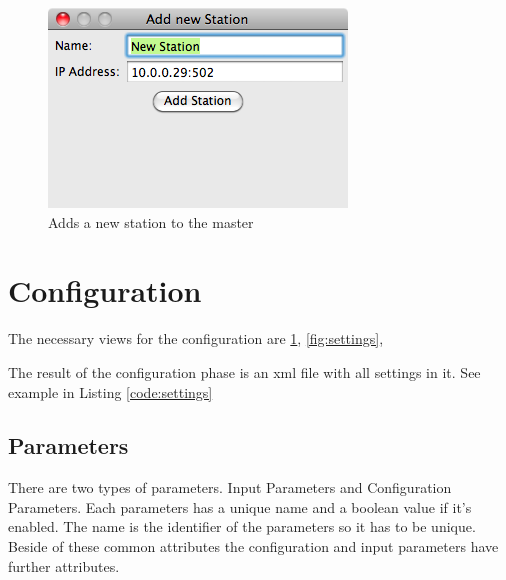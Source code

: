 \begin{figure}[ht]
    \centering
    \includegraphics[width=0.6\linewidth]{master/add.png}
    \caption{Adds a new station to the master}
    \label{fig:add}
\end{figure}


%

\section{Configuration} %
\label{sec:configuration} 
The necessary views for the configuration are \ref{fig:add}, \ref{fig:settings}, %

The result of the configuration phase is an xml file with all settings in it. See example in Listing \ref{code:settings}

{\C  }

\subsection{Parameters} %
\label{sub:parameters}
There are two types of parameters. Input Parameters and Configuration Parameters. Each parameters has a unique name and a boolean value if it's enabled. The name is the identifier of the parameters so it has to be unique. Beside of these common attributes the configuration and input parameters have further attributes.

